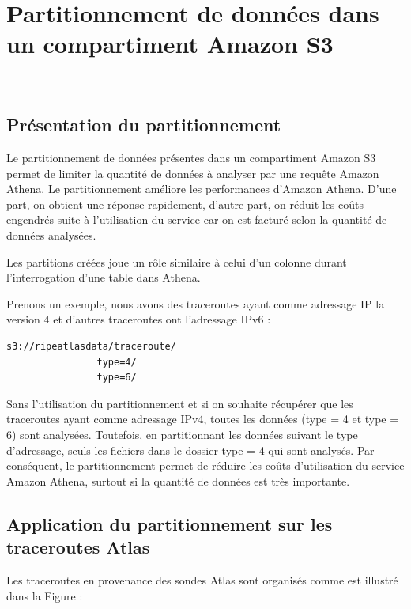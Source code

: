 \section{Partitionnement de données dans un compartiment Amazon S3} \label{subsubsection:partitionnement}~

\subsection{Présentation du partitionnement}
Le partitionnement  de données présentes dans un compartiment Amazon S3 permet de limiter la quantité de données à analyser par une requête Amazon Athena. Le partitionnement améliore  les performances d'Amazon Athena. D'une part, on obtient une réponse rapidement, d'autre part, on réduit les coûts engendrés  suite à l'utilisation du service car on est facturé selon la quantité de données analysées.  

Les partitions créées joue un rôle similaire à celui d'un colonne durant l'interrogation d'une table dans Athena. 

Prenons un exemple, nous avons des traceroutes ayant comme adressage IP la version  4 et d'autres traceroutes ont l'adressage IPv6 :

\begin{lstlisting}
s3://ripeatlasdata/traceroute/
				type=4/
				type=6/
\end{lstlisting}

Sans l'utilisation du partitionnement et si on souhaite récupérer que les traceroutes ayant comme adressage IPv4, toutes les données (type = 4 et type = 6) sont analysées. Toutefois, en partitionnant les données suivant le type d'adressage, seuls les fichiers dans le dossier type = 4 qui sont analysés. Par conséquent, le partitionnement permet de réduire les coûts d'utilisation du service Amazon Athena, surtout si la quantité de données est très importante. 


\subsection{Application du partitionnement sur les traceroutes Atlas}

Les traceroutes en provenance des sondes Atlas sont organisés comme est illustré dans la Figure :

